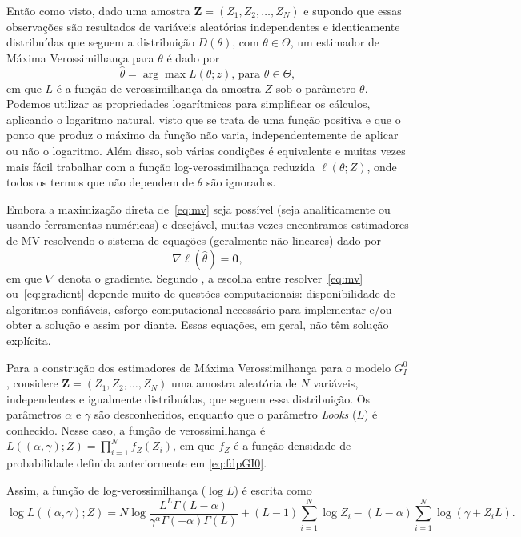 Então como visto, dado uma amostra $\bm Z = (Z_1, Z_2, \dots, Z_N)$ e supondo que essas observações são resultados de variáveis aleatórias independentes e identicamente distribuídas que seguem a distribuição $D(\theta)$, com $\theta \in \Theta$, um estimador de Máxima Verossimilhança para $\theta$ é dado por
\begin{equation}
    \widehat{\theta} = \arg\max L(\theta; z) \text{, para } \theta \in \Theta, \label{eq:mv}
\end{equation}
em que $L$ é a função de verossimilhança da amostra $Z$ sob o parâmetro $\theta$. Podemos utilizar as propriedades logarítmicas para simplificar os cálculos, aplicando o logaritmo natural, visto que se trata de uma função positiva e que o ponto que produz o máximo da função não varia, independentemente de aplicar ou não o logaritmo. 
Além disso, sob várias condições é equivalente e muitas vezes mais fácil trabalhar com a função log-verossimilhança reduzida $ \ell (\theta; Z)$, onde todos os termos que não dependem de $\theta$ são ignorados.

Embora a maximização direta de~\eqref{eq:mv} seja possível (seja analiticamente ou usando ferramentas numéricas) e desejável, muitas vezes encontramos estimadores de MV resolvendo o sistema de equações (geralmente não-lineares) dado por
\begin{equation}
    \nabla \ell (\widehat{\theta}) = \bm 0, \label{eq:gradient} 
\end{equation}
em que $\nabla$ denota o gradiente. 
Segundo \citet{FreryMinute2004}, a escolha entre resolver~\eqref{eq:mv} ou~\eqref{eq:gradient} depende muito de questões computacionais: disponibilidade de algoritmos confiáveis, esforço computacional necessário para implementar e/ou obter a solução e assim por diante. 
Essas equações, em geral, não têm solução explícita.

Para a construção dos estimadores de Máxima Verossimilhança para o modelo $G_I^0$, considere $\bm Z = (Z_1, Z_2, \dots, Z_N)$ uma amostra aleatória de $N$ variáveis, independentes e igualmente distribuídas, que seguem essa distribuição. 
Os parâmetros $\alpha$ e $\gamma$ são desconhecidos, enquanto que o parâmetro \textit{Looks} ($L$) é conhecido. 
Nesse caso, a função de verossimilhança é $L((\alpha, \gamma); Z) = \prod_{i=1}^{N} f_Z(Z_i)$, em que $f_Z$ é a função densidade de probabilidade definida anteriormente em \eqref{eq:fdpGI0}. 

Assim, a função de log-verossimilhança ($\log L$) é escrita como
\begin{equation}
    \log L((\alpha, \gamma); Z) = N\log \frac{L^{L}\Gamma(L-\alpha)}{\gamma^{\alpha}\Gamma(-\alpha)\Gamma(L)} +  (L-1)\sum_{i=1}^{N}\log Z_i - (L-\alpha)\sum_{i=1}^{N}\log (\gamma + Z_iL). \label{eq:logVer}
\end{equation}

